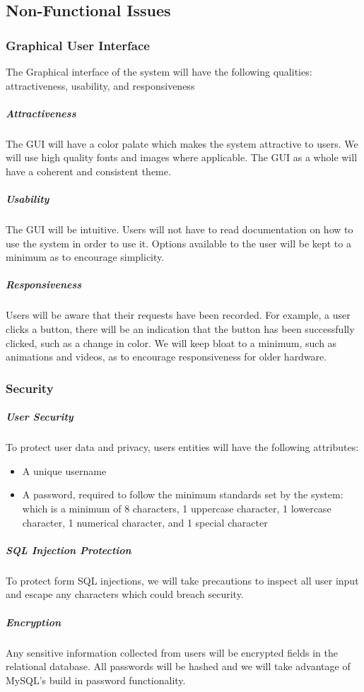 \documentclass[letter, 12pt, titlepage]{article}
\begin{document}
\subsection{Non-Functional Issues}

\subsubsection{Graphical User Interface}
The Graphical interface of the system will have the following qualities: attractiveness, usability, and responsiveness
\subparagraph{Attractiveness}
The GUI will have a color palate which makes the system attractive to users. We will use high quality fonts and images where applicable. The GUI as a whole will have a coherent and consistent theme.
\subparagraph{Usability}
The GUI will be intuitive. Users will not have to read documentation on how to use the system in order to use it. Options available to the user will be kept to a minimum as to encourage simplicity.
\subparagraph{Responsiveness}
Users will be aware that their requests have been recorded. For example, a user clicks a button, there will be an indication that the button has been successfully clicked, such as a change in color. We will keep bloat to a minimum, such as animations and videos, as to encourage responsiveness for older hardware.

\subsubsection{Security}
\subparagraph{User Security}
To protect user data and privacy, users entities will have the following attributes:
\begin{itemize}
	\item A unique username
	\item A password, required to follow the minimum standards set by the system: which is a minimum of 8 characters, 1 uppercase character, 1 lowercase character, 1 numerical character, and 1 special character
\end{itemize}

\subparagraph{SQL Injection Protection}
To protect form SQL injections, we will take precautions to inspect all user input and escape any characters which could breach security.

\subparagraph{Encryption}
Any sensitive information collected from users will be encrypted fields in the relational database. All passwords will be hashed and we will take advantage of MySQL's build in password functionality.
\end{document}
